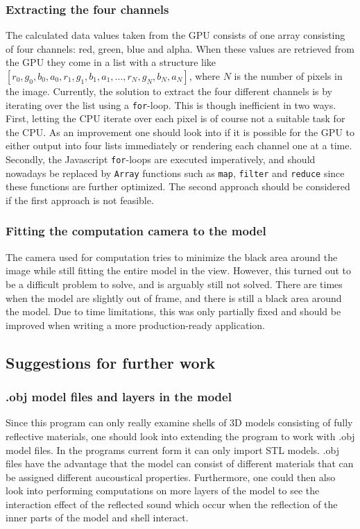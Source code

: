\documentclass[a4paper, 11pt]{article}
\begin{document}
        \subsubsection{Extracting the four channels}
        The calculated data values taken from the GPU consists of one array consisting of four channels: red, green, blue and alpha. When these values are retrieved from the GPU they come in a list with a structure like $[r_0, g_0, b_0, a_0, r_1, g_1, b_1, a_1, \dots, r_N, g_N, b_N, a_N]$, where $N$ is the number of pixels in the image. Currently, the solution to extract the four different channels is by iterating over the list using a \lstinline{for}-loop. This is though inefficient in two ways. First, letting the CPU iterate over each pixel is of course not a suitable task for the CPU. As an improvement one should look into if it is possible for the GPU to either output into four lists immediately or rendering each channel one at a time. Secondly, the Javascript \lstinline{for}-loops are executed imperatively, and should nowadays be replaced by \lstinline{Array} functions such as \lstinline{map}, \lstinline{filter} and \lstinline{reduce} since these functions are further optimized. The second approach should be considered if the first approach is not feasible.  

        \subsubsection{Fitting the computation camera to the model}
        The camera used for computation tries to minimize the black area around the image while still fitting the entire model in the view. However, this turned out to be a difficult problem to solve, and is arguably still not solved. There are times when the model are slightly out of frame, and there is still a black area around the model. Due to time limitations, this was only partially fixed and should be improved when writing a more production-ready application. 
        
    \subsection{Suggestions for further work}
        
        \subsubsection{.obj model files and layers in the model}
        Since this program can only really examine shells of 3D models consisting of fully reflective materials, one should look into extending the program to work with .obj model files. In the programs current form it can only import STL models. .obj files have the advantage that the model can consist of different materials that can be assigned different aucoustical properties. Furthermore, one could then also look into performing computations on more layers of the model to see the interaction effect of the reflected sound which occur when the reflection of the inner parts of the model and shell interact.  
\end{document}
